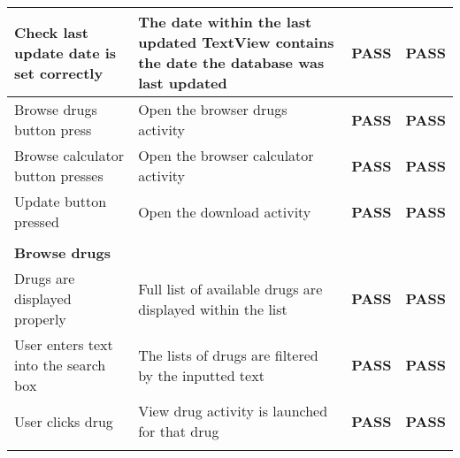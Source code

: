 \documentclass[11pt,fleqn,twoside]{article}
\begin{document}
\begin{center}
\begin{longtable}{| p{5cm} | p{5cm} | c | c |}
Check last update date is set correctly                                    & The date within the last updated TextView contains the date the database was last updated        & \textbf{PASS}         & \textbf{PASS}          \\ \hline
Browse drugs button press                                                  & Open the browser drugs activity                                                                  & \textbf{PASS}         & \textbf{PASS}          \\ \hline
Browse calculator button presses                                           & Open the browser calculator activity                                                             & \textbf{PASS}         & \textbf{PASS}          \\ \hline
Update button pressed                                                      & Open the download activity                                                                       & \textbf{PASS}         & \textbf{PASS}          \\ \hline
                                                                           &                                                                                                  & \textbf{}             & \textbf{}              \\ \hline
\textbf{Browse drugs}                                                      &                                                                                                  & \textbf{}             & \textbf{}              \\ \hline
Drugs are displayed properly                                               & Full list of available drugs are displayed within the list                                       & \textbf{PASS}         & \textbf{PASS}          \\ \hline
User enters text into the search box                                       & The lists of drugs are filtered by the inputted text                                             & \textbf{PASS}         & \textbf{PASS}          \\ \hline
User clicks drug                                                           & View drug activity is launched for that drug                                                     & \textbf{PASS}         & \textbf{PASS}          \\ \hline
                                                                           &                                                                                                  & \textbf{}             & \textbf{}              \\ \hline

\end{longtable}
\end{center}
\end{document}
